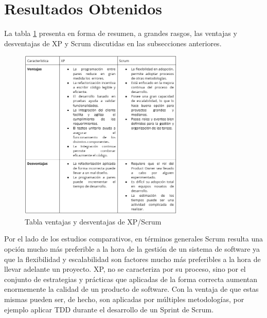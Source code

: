 \documentclass[a4paper,10pt]{article}
\begin{document}
	\section{Resultados Obtenidos}
	La tabla \ref{tabla_ventajas_desventajas} presenta en forma de resumen, a grandes rasgos, las ventajas y desventajas de XP y Scrum discutidas en las subsecciones anteriores.
	\begin{figure}[h]
		\centering
		\includegraphics[width=0.7\textwidth]{tablaVentajasDesventajas.PNG}
		\caption{Tabla ventajas y desventajas de XP/Scrum}
		\label{tabla_ventajas_desventajas}
	\end{figure}\newline
	Por el lado de los estudios comparativos, en términos generales Scrum resulta una opción mucho más preferible a la hora de la gestión de un sistema de software ya que la flexibilidad y escalabilidad son factores mucho más preferibles a la hora de llevar adelante un proyecto. XP, no se caracteriza por su proceso, sino por el conjunto de estrategias y prácticas que aplicadas de la forma correcta aumentan enormemente la calidad de un producto de software. Con la ventaja de que estas mismas pueden ser, de hecho, son aplicadas por múltiples metodologías, por ejemplo aplicar TDD durante el desarrollo de un Sprint de Scrum.
\end{document}
